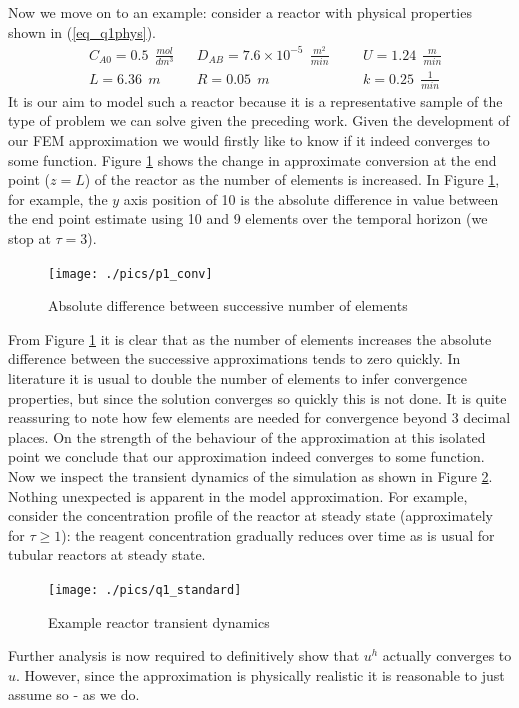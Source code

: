 \documentclass[11pt,fleqn]{article}
\theoremstyle{defstyle}
\begin{document}
Now we move on to an example: consider a reactor with physical properties shown in (\ref{eq_q1phys}).
\begin{equation}
\begin{aligned}
&C_{A0} = 0.5~~ \frac{mol}{dm^3}
&&D_{AB} = 7.6\times 10^{-5} ~~\frac{m^2}{min}
&&&U = 1.24~~ \frac{m}{min} \\
&L = 6.36~~ m 
&&R = 0.05~~ m
&&&k = 0.25~~ \frac{1}{min} 
\end{aligned}
\label{eq_q1phys}
\end{equation}
It is our aim to model such a reactor because it is a representative sample of the type of problem we can solve given the preceding work. Given the development of our FEM approximation we would firstly like to know if it indeed converges to some function. Figure \ref{fig_p1conv} shows the change in approximate conversion at the end point ($z=L$) of the reactor as the number of elements is increased. In Figure \ref{fig_p1conv}, for example, the $y$ axis position of 10 is the absolute difference in value between the end point estimate using 10 and 9 elements over the temporal horizon (we stop at $\tau=3$).
\begin{figure}[H] 
\centering
\texttt{[image: ./pics/p1\_conv]}
\caption{Absolute difference between successive number of elements} 
\label{fig_p1conv}
\end{figure}
From Figure \ref{fig_p1conv} it is clear that as the number of elements increases the absolute difference between the successive approximations tends to zero quickly. In literature it is usual to double the number of elements to infer convergence properties, but since the solution converges so quickly this is not done. It is quite reassuring to note how few elements are needed for convergence beyond 3 decimal places. On the strength of the behaviour of the approximation at this isolated point we conclude that our approximation indeed converges to some function. Now we inspect the transient dynamics of the simulation as shown in Figure \ref{fig_q1std}. Nothing unexpected is apparent in the model approximation. For example, consider the concentration profile of the reactor at steady state (approximately for $\tau \geq 1$): the reagent concentration gradually reduces over time as is usual for tubular reactors at steady state.
\begin{figure}[H] 
\centering
\texttt{[image: ./pics/q1\_standard]}
\caption{Example reactor transient dynamics} 
\label{fig_q1std}
\end{figure}
Further analysis is now required to definitively show that $u^h$ actually converges to $u$. However, since the approximation is physically realistic it is reasonable to just assume so - as we do.
\end{document}
